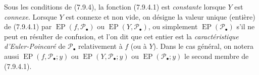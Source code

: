 \begin{env}[7.9.5]
\label{III.7.9.5.fr}
Sous les conditions de (7.9.4), la fonction (7.9.4.1) est \emph{constante}
lorsque $Y$ est \emph{connexe}. Lorsque $Y$ est connexe et non vide, on désigne
la valeur unique (entière) de (7.9.4.1) par $\operatorname{EP}(f,\mathscr P_\bullet)$ ou $\operatorname{EP}(Y,\mathscr P_\bullet)$, ou simplement
$\operatorname{EP}(\mathscr P_\bullet)$
s'il ne peut en résulter de confusion, et l'on dit que cet entier est la
\emph{caractéristique d'Euler-Poincaré} de $\mathscr P_\bullet$ relativement à
$f$ (ou à $Y$). Dans le cas général, on notera aussi $\operatorname{EP}(f,\mathscr P_\bullet;y)$ ou $\operatorname{EP}(Y,\mathscr P_\bullet;y)$ ou
$\operatorname{EP}(\mathscr P_\bullet;y)$
le second membre de (7.9.4.1).
\end{env}

